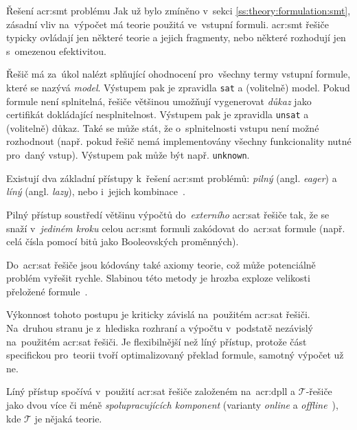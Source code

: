 \documentclass[thesis=M,czech]{FITthesis}[2012/06/26]
\newcommand{\acrlabel}[1]{acr:#1}
\newcommand{\acr}[1]{\acrshort{\acrlabel{#1}}}
\newcommand{\id}[1]{\texttt{#1}}
\newcommand{\hl}[1]{\textit{#1}}
\newcommand{\name}[1]{\hl{#1}}
\newcommand{\cit}[1]{\cite{#1}}
\newcommand{\rf}[1]{\ref{#1}}
\newcommand{\set}[1]{\ensuremath{\mathcal{#1}}}
\begin{document}

\begin{section}{Řešení \acr{smt} problému}\label{s:search:smt}
Jak už bylo zmíněno v~sekci \rf{ss:theory:formulation:smt},
zásadní vliv na~výpočet má teorie použitá ve~vstupní formuli.
\acr{smt} řešiče typicky ovládají jen některé teorie
a jejich fragmenty, nebo některé rozhodují jen s~omezenou efektivitou.

Řešič má za~úkol nalézt splňující ohodnocení
pro~všechny termy vstupní formule,
které se nazývá \name{model}.
Výstupem pak je zpravidla \id{sat} a (volitelně) model.
Pokud formule není splnitelná,
řešiče většinou umožňují vygenerovat
\hl{důkaz} jako certifikát dokládající nesplnitelnost.
Výstupem pak je zpravidla \id{unsat}
a (volitelně) důkaz.
Také se může stát,
že o~splnitelnosti vstupu není možné rozhodnout
(např. pokud řešič nemá implementovány
všechny funkcionality nutné pro~daný vstup).
Výstupem pak může být např. \id{unknown}.

Existují dva základní přístupy k~řešení \acr{smt} problémů:
\name{pilný} (angl. \name{eager}) a \name{líný} (angl. \name{lazy}),
nebo i~jejich kombinace~\cit{smt-stanford}.


\begin{paragraph}{Pilný přístup}\label{p:search:smt:eager}
soustředí většinu výpočtů
do~\hl{externího} \acr{sat} řešiče tak,
že se snaží v~\hl{jediném kroku} celou \acr{smt} formuli zakódovat
do~\acr{sat} formule (např. celá čísla pomocí bitů
jako Booleovských proměnných).

Do~\acr{sat} řešiče jsou kódovány
také axiomy teorie,
což může potenciálně problém vyřešit rychle.
Slabinou této metody je hrozba exploze
velikosti přeložené formule~\cit{smt-stanford}.

Výkonnost tohoto postupu je kriticky závislá na~použitém \acr{sat} řešiči.
Na~druhou stranu je z~hlediska rozhraní a výpočtu
v~podstatě nezávislý na~použitém \acr{sat} řešiči.
Je flexibilnější než líný přístup,
protože část specifickou pro~teorii tvoří 
optimalizovaný překlad formule,
samotný výpočet už ne.
\end{paragraph} %


\begin{paragraph}{Líný přístup}\label{p:search:smt:lazy}
spočívá v~použití \acr{sat} řešiče
založeném na~\acr{dpll}
a \set{T}-řešiče
jako dvou více či méně \hl{spolupracujících komponent}
(varianty \name{online} a \name{offline}~\cit{smt-stanford}),
kde \set{T} je nějaká teorie.


\end{paragraph}
\end{section}
\end{document}
